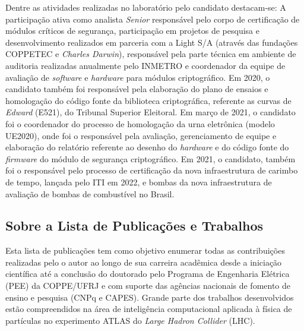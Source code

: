Dentre as atividades realizadas no laboratório pelo candidato destacam-se: A participação ativa como 
analista \emph{Senior} responsável pelo corpo de certificação de módulos críticos de segurança, participação 
em projetos de pesquisa e desenvolvimento realizados em parceria com a Light S/A (através das fundações 
COPPETEC e \emph{Charles Darwin}), responsável pela parte técnica em ambiente de auditoria realizadas anualmente 
pelo INMETRO e coordenador da equipe de avaliação de \emph{software} e \emph{hardware} para módulos criptográfico. 
Em 2020, o candidato também foi responsável pela elaboração do plano de ensaios e homologação 
do código fonte da biblioteca criptográfica, referente as curvas de \emph{Edward} (E521), do Tribunal Superior 
Eleitoral. Em março de 2021, o candidato foi o coordenador do processo de homologação da urna 
eletrônica (modelo UE2020), onde foi o responsável pela avaliação, gerenciamento de equipe e elaboração do relatório referente 
ao desenho do \emph{hardware} e do código fonte do \emph{firmware} do módulo de segurança criptográfico. Em 2021, o 
candidato, também foi o responsável pelo processo de certificação da nova infraestrutura 
de carimbo de tempo, lançada pelo ITI em 2022, e bombas da nova infraestrutura de avaliação de bombas de 
combustível no Brasil.









\subsection{Sobre a Lista de Publicações e Trabalhos}

Esta lista de publicações tem como objetivo enumerar todas as contribuições realizadas pelo o autor ao longo de sua carreira acadêmica desde a iniciação científica  até a conclusão do doutorado pelo Programa de Engenharia Elétrica (PEE) da COPPE/UFRJ e com suporte das agências nacionais de fomento de ensino e pesquisa (CNPq e CAPES). Grande parte dos trabalhos desenvolvidos estão compreendidos na área de inteligência computacional aplicada à física de partículas no experimento ATLAS do \emph{Large Hadron Collider} (LHC).

